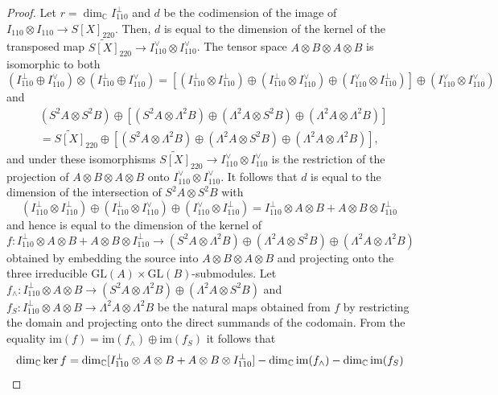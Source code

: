 \documentclass[12pt]{amsart}
\theoremstyle{definition}
\theoremstyle{remark}
\theoremstyle{definition}
\newcommand{\CC}{\mathbb{C}}
\begin{document}
\begin{proof}
  Let $r=\dim_\CC I_{110}^\perp$ and $d$ be the codimension of the image of $I_{110}\otimes I_{110} \to S[X]_{220}$. Then, $d$ is equal to the dimension of the kernel of the transposed map $
  \widetilde{S[X]}_{220} \to I_{110}^\vee\otimes I_{110}^\vee$.
  The tensor space $A\otimes B\otimes A\otimes B$ is isomorphic to both
  \[
  (I_{110}^\perp\oplus I_{110}^\vee) \otimes (I_{110}^\perp \oplus I_{110}^\vee)= [(I_{110}^\perp\otimes I_{110}^\perp) \oplus  (I_{110}^\perp \otimes I_{110}^\vee)\oplus (I_{110}^\vee\otimes I_{110}^\perp)]\oplus (I_{110}^\vee\otimes I_{110}^\vee)
  \]
  and
  \begin{align*}
  &(S^2 A\otimes S^2 B) \oplus [(S^2 A\otimes \Lambda^2 B) \oplus (\Lambda^2 A\otimes S^2 B) \oplus (\Lambda^2 A\otimes \Lambda^2 B)] \\
  &= \widetilde{S[X]}_{220} \oplus [(S^2 A\otimes \Lambda^2 B) \oplus (\Lambda^2 A\otimes S^2 B) \oplus (\Lambda^2 A\otimes \Lambda^2 B)],
\end{align*}
  and under these isomorphisms $\widetilde{S[X]}_{220} \to I_{110}^\vee\otimes I_{110}^\vee$ is the restriction of the projection of $A\otimes B\otimes A\otimes B$ onto $I_{110}^\vee\otimes I_{110}^\vee$. It follows that $d$ is equal to the dimension of the intersection of  $S^2A\otimes S^2 B$ with 
  \[
  (I_{110}^\perp\otimes I_{110}^\perp) \oplus ( I_{110}^\perp\otimes I_{110}^\vee) \oplus ( I_{110}^\vee\otimes I_{110}^\perp) = I_{110}^\perp \otimes A\otimes B + A\otimes B \otimes I_{110}^\perp 
  \]
  and hence is equal to the dimension of the kernel of
  \[
  f\colon I_{110}^\perp \otimes A\otimes B + A\otimes B \otimes I_{110}^\perp \to (S^2 A\otimes \Lambda^2 B) \oplus (\Lambda^2 A\otimes S^2 B) \oplus (\Lambda^2 A\otimes \Lambda^2 B)
  \]
  obtained by embedding the source into $A\otimes B\otimes A\otimes B$ and projecting onto the three irreducible $\mathrm{GL}(A)\times \mathrm{GL}(B)$-submodules.
  Let $f_{\wedge}\colon I_{110}^\perp \otimes A\otimes B \to (S^2 A\otimes \Lambda^2 B) \oplus (\Lambda^2 A\otimes S^2 B)$ and $f_S\colon I_{110}^\perp \otimes A\otimes B \to \Lambda^2 A\otimes \Lambda^2 B$ be the natural maps obtained from $f$ by restricting the domain and projecting onto the direct summands of the codomain. 
  From the equality $\mathrm{im}(f) = \mathrm{im}(f_\wedge) \oplus \mathrm{im}(f_S)$ it follows that
  \begin{align}
  &\dim_\CC \ker f = \dim_\CC [I_{110}^\perp \otimes A\otimes B + A\otimes B \otimes I_{110}^\perp] - \dim_\CC \mathrm{im}(f_\wedge) - \dim_\CC \mathrm{im}(f_S)\notag \\

\end{align}
\end{proof}
\end{document}
